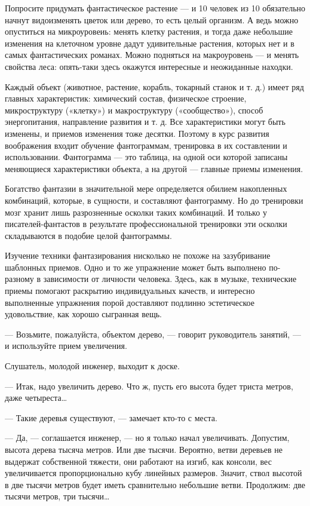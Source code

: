 Попросите  придумать  фантастическое  растение  —   и  10  человек  из  10
обязательно начнут видоизменять цветок или дерево, то есть целый организм.
А  ведь  можно  опуститься  на микроуровеиь:  менять  клетку  растения,  и
тогда  даже небольшие  изменения  на клеточном  уровне дадут  удивительные
растения, которых нет и в самых фантастических романах. Можно подняться на
макроуровень  ---  и  менять  свойства  леса:  опять-таки  здесь  окажутся
интересные и неожиданные находки.

Каждый объект (животное, растение, корабль, токарный станок и т. д.) имеет
ряд  главных  характеристик:   химический  состав,  физическое   строение,
микроструктуру  («клетку»)   и   макроструктуру   («сообщество»),   способ
энергопитания, направление развития и т. д. Все характеристики могут  быть
изменены, и  приемов  изменения  тоже десятки.  Поэтому  в  курс  развития
воображения входит обучение  фантограммам, тренировка в  их составлении  и
использовании. Фантограмма —  это таблица, на  одной оси которой  записаны
меняющиеся характеристики объекта, а на другой — главные приемы изменения.

Богатство фантазии в  значительной мере  определяется обилием  накопленных
комбинаций,  которые,  в  сущности,   и  составляют  фантограмму.  Но   до
тренировки мозг  хранит  лишь  разрозненные осколки  таких  комбинаций.  И
только у писателей-фантастов в результате профессиональной тренировки  эти
осколки складываются в подобие целой фантограммы.

Изучение  техники  фантазирования  нисколько  не  похоже  на  зазубривание
шаблонных приемов. Одно и то же упражнение может быть выполнено по-разному
в зависимости  от  личности человека.  Здесь,  как в  музыке,  технические
приемы помогают раскрытию индивидуальных качеств, и интересно  выполненные
упражнения порой доставляют подлинно эстетическое удовольствие, как хорошо
сыгранная вещь.

— Возьмите, пожалуйста, объектом дерево, — говорит руководитель занятий, —
и используйте прием увеличения.

Слушатель, молодой инженер, выходит к доске.

— Итак,  надо увеличить  дерево.  Что ж,  пусть  его высота  будет  триста
метров, даже четыреста…

— Такие деревья существуют, — замечает кто-то с места.

— Да, — соглашается  инженер, — но я  только начал увеличивать.  Допустим,
высота дерева тысяча метров. Или  две тысячи. Вероятно, ветви деревьев  не
выдержат собственной  тяжести, они  работают на  изгиб, как  консоли,  вес
увеличивается  пропорционально  кубу  линейных  размеров.  Значит,   ствол
высотой в  две тысячи  метров будет  иметь сравнительно  небольшие  ветви.
Продолжим: две тысячи метров, три тысячи…

